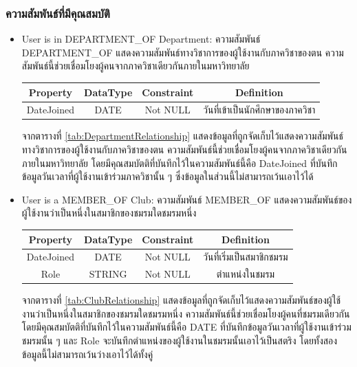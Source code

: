 \documentclass[14pt,oneside,openright,a4paper]{cpe-thai-project}
\begin{document}
    \subsubsection{ความสัมพันธ์ที่มีคุณสมบัติ}
    \begin{itemize}
      \normalsize
      \item User is in DEPARTMENT\_OF Department: ความสัมพันธ์ DEPARTMENT\_OF แสดงความสัมพันธ์ทางวิชาการของผู้ใช้งานกับภาควิชาของตน ความสัมพันธ์นี้ช่วยเชื่อมโยงผู้คนจากภาควิชาเดียวกันภายในมหาวิทยาลัย
        \begin{center}
          \begin{tabular}{|c|c|c|c|}
          \hline
          \rowcolor[HTML]{9FC5E8} 
          Property   & DataType & Constraint & Definition \\ \hline
          DateJoined & DATE     & Not NULL    & วันที่เข้าเป็นนักศึกษาของภาควิชา \\ \hline
          \end{tabular}
          \label{tab:DepartmentRelationship}
        \end{center}
        จากตารางที่ \ref{tab:DepartmentRelationship} แสดงข้อมูลที่ถูกจัดเก็บไว้แสดงความสัมพันธ์ทางวิชาการของผู้ใช้งานกับภาควิชาของตน ความสัมพันธ์นี้ช่วยเชื่อมโยงผู้คนจากภาควิชาเดียวกันภายในมหาวิทยาลัย โดยมีคุณสมบัตติที่บันทึกไว้ในความสัมพันธ์นี้คือ DateJoined ที่บันทึกข้อมูลวันเวลาที่ผู้ใช้งานเข้าร่วมภาควิชานั้น ๆ ซึ่งข้อมูลในส่วนนี้ไม่สามารถเว้นเอาไว้ได้ 
      \item User is a MEMBER\_OF Club: ความสัมพันธ์ MEMBER\_OF แสดงความสัมพันธ์ของผู้ใช้งานว่าเป็นหนึ่งในสมาชิกของชมรมใดชมรมหนึ่ง
        \begin{center}
          \begin{tabular}{|c|c|c|c|}
          \hline
          \rowcolor[HTML]{9FC5E8} 
          Property   & DataType & Constraint & Definition \\ \hline
          DateJoined & DATE     & Not NULL    & วันที่เริ่มเป็นสมาชิกชมรม \\ \hline
          Role       & STRING   & Not NULL    & ตำแหน่งในชมรม \\ \hline
          \end{tabular}
          \label{tab:ClubRelationship}
        \end{center}
        จากตารางที่ \ref{tab:ClubRelationship} แสดงข้อมูลที่ถูกจัดเก็บไว้แสดงความสัมพันธ์ของผู้ใช้งานว่าเป็นหนึ่งในสมาชิกของชมรมใดชมรมหนึ่ง ความสัมพันธ์นี้ช่วยเชื่อมโยงผู้คนที่ชมรมเดียวกัน โดยมีคุณสมบัตติที่บันทึกไว้ในความสัมพันธ์นี้คือ DATE ที่บันทึกข้อมูลวันเวลาที่ผู้ใช้งานเข้าร่วมชมรมนั้น ๆ และ Role จะบันทึกตำแหน่งของผู้ใช้งานในชมรมนั้นเอาไว้เป็นสตริง โดยทั้งสองข้อมูลนี้ไม่สามารถเว้นว่างเอาไว้ได้ทั้งคู่

\end{itemize}
\end{document}
